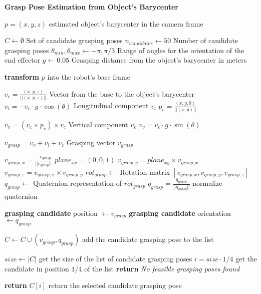 \begin{algorithm}[h]
    \caption{\textbf{Grasp Pose Estimation from Object's Barycenter}}
    \label{alg:grasping}
    \begin{algorithmic}[1]
    \Require $p = (x, y, z)$ estimated object's barycenter in the camera frame

    \State $C \gets \emptyset$ \Comment Set of candidate grasping poses
    \State $n_{candidates} \gets 50$ \Comment Number of candidate grasping poses
    \State $\theta_{min}, \theta_{max} \gets -\pi, \pi/3$ \Comment Range of angles for the orientation of the end effector
    \State $g \gets 0.05$ \Comment Grasping distance from the object's barycenter in meters

    \State \textbf{transform} $p$ into the robot's base frame

        \State $v_{c} = \frac{(x,y,z)}{||(x,y,z)||}$ \Comment Vector from the base to the object's barycenter
        \State $v_{l} = -v_{c} \cdot g \cdot \cos(\theta)$ \Comment Longitudinal component $v_l$
        \State $p_v = \frac{(x, y, 0)}{||(x,y)||}$ 

        \State $v_v = (v_c \times p_v) \times v_c$ \Comment Vertical component $v_v$
        \State $v_v = v_v \cdot g \cdot \sin(\theta)$
        
        \State $v_{grasp} = v_v + v_l + v_c$ \Comment Grasping vector $v_{grasp}$
        
        \State $v_{grasp, x} = \frac{-v_{grasp}}{||v_{grasp}||}$ 
        \State $plane_{xy} = (0, 0, 1)$ 
        \State $v_{grasp, y} = plane_{xy} \times v_{grasp, x}$
        \State $v_{grasp, z} = v_{grasp, x} \times v_{grasp, y}$
        \State $rot_{grasp} \gets$ Rotation matrix $\left[v_{grasp, x}, v_{grasp, y}, v_{grasp, z}\right]$
        \State $q_{grasp} \gets$ Quaternion representation of $rot_{grasp}$
        \State $q_{grasp} = \frac{q_{grasp}}{||q_{grasp}||} $   \Comment normalize quaternion
        
        \State \textbf{grasping candidate} position $\gets v_{grasp}$
        \State \textbf{grasping candidate} orientation $\gets q_{grasp}$

            \State $C \gets C \cup (v_{grasp}, q_{grasp})$ \Comment add the candidate grasping pose to the list
        \EndIf
    \EndFor

    \State $size \gets |C|$ \Comment get the size of the list of candidate grasping poses
        \State $i = size \cdot 1/4$ \Comment get the candidate in position $1/4$ of the list
    \Else 
        \State \textbf{return} \textit{No feasible grasping poses found}
    \EndIf 

    \State \textbf{return} $C[i]$ \Comment return the selected candidate grasping pose

    \end{algorithmic}
\end{algorithm}

